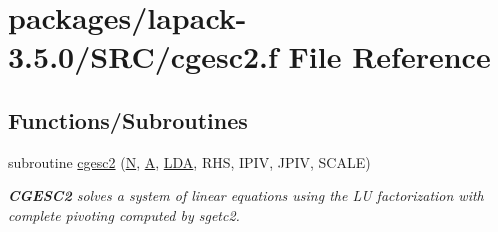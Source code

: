 \hypertarget{cgesc2_8f}{}\section{packages/lapack-\/3.5.0/\+S\+R\+C/cgesc2.f File Reference}
\label{cgesc2_8f}
\subsection*{Functions/\+Subroutines}
\begin{DoxyCompactItemize}
\item 
subroutine \hyperlink{group__complexGEauxiliary_gae8e5c5211c3b35cb3ebb10160a141e2d}{cgesc2} (\hyperlink{polmisc_8c_a0240ac851181b84ac374872dc5434ee4}{N}, \hyperlink{classA}{A}, \hyperlink{example__user_8c_ae946da542ce0db94dced19b2ecefd1aa}{L\+D\+A}, R\+H\+S, I\+P\+I\+V, J\+P\+I\+V, S\+C\+A\+L\+E)
\begin{DoxyCompactList}\small\item\em {\bfseries C\+G\+E\+S\+C2} solves a system of linear equations using the L\+U factorization with complete pivoting computed by sgetc2. \end{DoxyCompactList}\end{DoxyCompactItemize}
